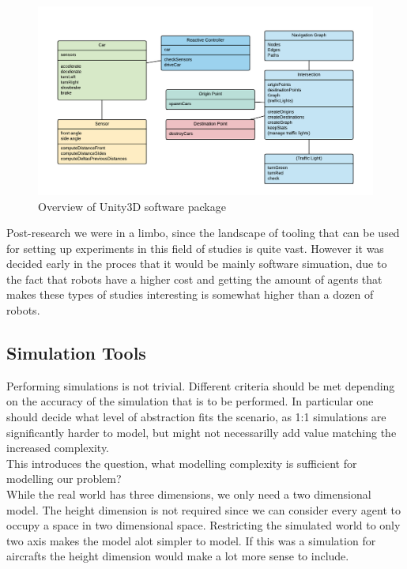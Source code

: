 \begin{figure}
\centering
\includegraphics[scale=.6]{img/classdiagram}
\caption{Overview of Unity3D software package}
\label{figure:classdiagram}
\end{figure}

Post-research we were in a limbo, since the landscape of tooling that can be used for setting up experiments in this field of studies is  quite  vast.
However it was decided early in the proces that it would be mainly software simuation, due to the fact that robots have a higher cost and getting the amount of agents that makes these types of studies interesting is somewhat higher than a dozen of robots.

\subsection{Simulation Tools}
Performing simulations is not trivial. Different criteria should be met depending on the accuracy of the simulation that is to be performed.
In particular one should decide what level of abstraction fits the scenario, as 1:1 simulations are significantly harder to model, but might not necessarilly add value matching the increased complexity.\\

This introduces the question, what modelling complexity is sufficient for modelling our problem?\\

While the real world has three dimensions, we only need a two dimensional model.
The height dimension is not required since we can consider every agent to occupy a space in two dimensional space.
Restricting the simulated world to only two axis makes the model alot simpler to model.
If this was a simulation for aircrafts the height dimension would make a lot more sense to include.\\

